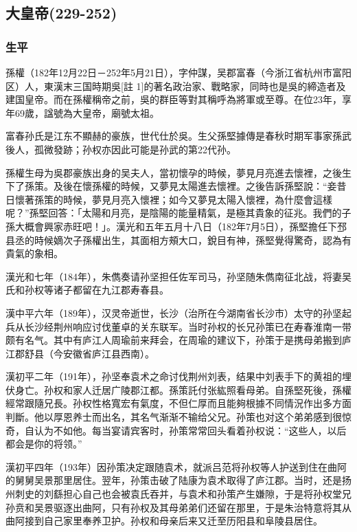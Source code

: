 
\subsection{大皇帝\tiny(229-252)}

\subsubsection{生平}

孫權（182年12月22日－252年5月21日），字仲謀，吴郡富春（今浙江省杭州市富阳区）人，東漢末三国時期吳[註 1]的著名政治家、戰略家，同時也是吳的締造者及建国皇帝。而在孫權稱帝之前，吳的群臣等對其稱呼為將軍或至尊。在位23年，享年69歲，諡號為大皇帝，廟號太祖。

富春孙氏是江东不顯赫的豪族，世代仕於吳。生父孫堅據傳是春秋时期军事家孫武後人，孤微發跡；孙权亦因此可能是孙武的第22代孙。

孫權生母为吳郡豪族出身的吴夫人，當初懷孕的時候，夢見月亮進去懷裡，之後生下了孫策。及後在懷孫權的時候，又夢見太陽進去懷裡。之後告訴孫堅說：“妾昔日懷著孫策的時候，夢見月亮入懷裡；如今又夢見太陽入懷裡，為什麼會這樣呢？”孫堅回答：「太陽和月亮，是陰陽的能量精氣，是極其貴象的征兆。我們的子孫大概會興家赤旺吧！」。漢光和五年五月十八日（182年7月5日），孫堅擔任下邳县丞的時候嫡次子孫權出生，其面相方頰大口，銳目有神，孫堅覺得驚奇，認為有貴氣的象相。

漢光和七年（184年），朱儁奏请孙坚担任佐军司马，孙坚随朱儁南征北战，将妻吴氏和孙权等诸子都留在九江郡寿春县。

漢中平六年（189年），汉灵帝逝世，长沙（治所在今湖南省长沙市）太守的孙坚起兵从长沙经荆州响应讨伐董卓的关东联军。当时孙权的长兄孙策已在寿春淮南一带颇有名气。其中有庐江人周瑜前来拜会，在周瑜的建议下，孙策于是携母弟搬到庐江郡舒县（今安徽省庐江县西南）。

漢初平二年（191年），孙坚奉袁术之命讨伐荆州刘表，结果中刘表手下的黄祖的埋伏身亡。孙权和家人迁居广陵郡江都。孫策託付张紘照看母弟。自孫堅死後，孫權經常跟隨兄長。孙权性格寬宏有氣度，不但仁厚而且能夠根據不同情況作出多方面判斷。他以厚恩养士而出名，其名气渐渐不输给父兄。孙策也对这个弟弟感到很惊奇，自认为不如他。每当宴请宾客时，孙策常常回头看着孙权说：“这些人，以后都会是你的将领。”

漢初平四年（193年）因孙策决定跟随袁术，就派吕范将孙权等人护送到住在曲阿的舅舅吴景那里居住。翌年，孙策击破了陆康为袁术取得了庐江郡。当时，还是扬州刺史的刘繇担心自己也会被袁氏吞并，与袁术和孙策产生嫌隙，于是将孙权堂兄孙贲和吴景驱逐出曲阿，只有孙权及其母弟弟们还留在那里，于是朱治特意将其从曲阿接到自己家里奉养卫护。孙权和母亲后来又迁至历阳县和阜陵县居住。

